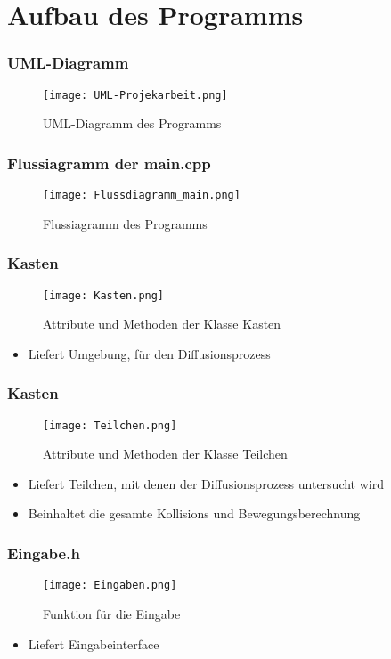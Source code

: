 \documentclass{beamer}
\begin{document}
\section{Aufbau des Programms}

\begin{frame} %
  \frametitle{UML-Diagramm} %
  \begin{figure}[htb]
		\centering
		\texttt{[image: UML-Projekarbeit.png]}
		\caption{UML-Diagramm des Programms}
  \end{figure}
\end{frame}

\begin{frame} %
  \frametitle{Flussiagramm der main.cpp} %
  \begin{figure}[htb]
		\centering
		\texttt{[image: Flussdiagramm\_main.png]}
		\caption{Flussiagramm des Programms}
  \end{figure}
\end{frame}

\begin{frame} %
  \frametitle{Kasten} %
  \begin{figure}
		\centering
		\texttt{[image: Kasten.png]}
		\caption{Attribute und Methoden der Klasse Kasten}
  \end{figure}
  \begin{itemize}
  	\item Liefert Umgebung, für den Diffusionsprozess
  \end{itemize}
\end{frame}

\begin{frame} %
	  \frametitle{Kasten} %
 \begin{figure}
		\centering
		\texttt{[image: Teilchen.png]}
		\caption{Attribute und Methoden der Klasse Teilchen}
  \end{figure}
  	\begin{itemize}
	  	\item Liefert Teilchen, mit denen der Diffusionsprozess untersucht wird
	 	\item Beinhaltet die gesamte Kollisions und Bewegungsberechnung
	\end{itemize}
\end{frame}

\begin{frame} %
  \frametitle{Eingabe.h} %
  \begin{figure}
		\centering
		\texttt{[image: Eingaben.png]}
		\caption{Funktion für die Eingabe}
  \end{figure}
  \begin{itemize}
  	\item Liefert Eingabeinterface
  \end{itemize}
\end{frame}
\end{document}
